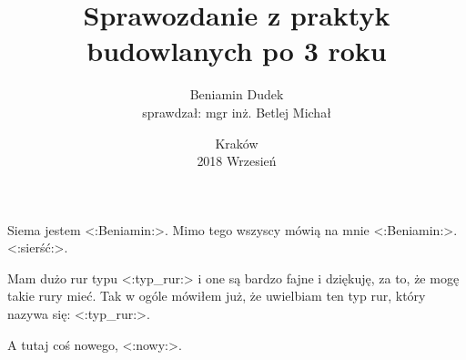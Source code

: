 \documentclass[a4paper,11pt,fleqn]{mwart}
\title{Sprawozdanie z praktyk budowlanych po 3 roku}
\date{Kraków\\ 2018 Wrzesień}
\author{Beniamin Dudek \\ sprawdzał: mgr inż. Betlej Michał}
\begin{document}
	\maketitle
	Siema jestem <:Beniamin:>. Mimo tego wszyscy mówią na mnie <:Beniamin:>.
	<:sierść:>.

	Mam dużo rur typu <:typ_rur:> i one są bardzo fajne i dziękuję, za to, że mogę takie rury mieć.
	Tak w ogóle mówiłem już, że uwielbiam ten typ rur, który nazywa się: <:typ_rur:>.

	A tutaj coś nowego, <:nowy:>.
\end{document}
